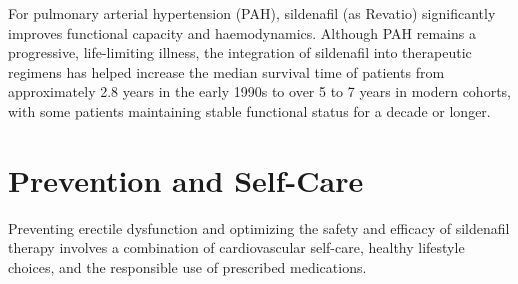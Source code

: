 For pulmonary arterial hypertension (PAH), sildenafil (as Revatio) significantly improves functional capacity and haemodynamics. Although PAH remains a progressive, life-limiting illness, the integration of sildenafil into therapeutic regimens has helped increase the median survival time of patients from approximately 2.8 years in the early 1990s to over 5 to 7 years in modern cohorts, with some patients maintaining stable functional status for a decade or longer.

\section*{Prevention and Self-Care}
Preventing erectile dysfunction and optimizing the safety and efficacy of sildenafil therapy involves a combination of cardiovascular self-care, healthy lifestyle choices, and the responsible use of prescribed medications.


